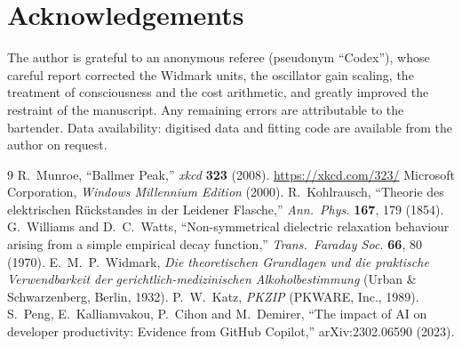 \documentclass[11pt]{article}
\begin{document}
\section*{Acknowledgements}
The author is grateful to an anonymous referee (pseudonym ``Codex''), whose careful report corrected the Widmark units, the oscillator gain scaling, the treatment of consciousness and the cost arithmetic, and greatly improved the restraint of the manuscript. Any remaining errors are attributable to the bartender. Data availability: digitised data and fitting code are available from the author on request.

\begin{thebibliography}{9}
 R.~Munroe, ``Ballmer Peak,'' \emph{xkcd} \textbf{323} (2008). \url{https://xkcd.com/323/}
 Microsoft Corporation, \emph{Windows Millennium Edition} (2000).
 R.~Kohlrausch, ``Theorie des elektrischen R\"uckstandes in der Leidener Flasche,'' \emph{Ann.\ Phys.} \textbf{167}, 179 (1854).
 G.~Williams and D.~C.~Watts, ``Non-symmetrical dielectric relaxation behaviour arising from a simple empirical decay function,'' \emph{Trans.\ Faraday Soc.} \textbf{66}, 80 (1970).
 E.~M.~P.~Widmark, \emph{Die theoretischen Grundlagen und die praktische Verwendbarkeit der gerichtlich-medizinischen Alkoholbestimmung} (Urban \& Schwarzenberg, Berlin, 1932).
 P.~W.~Katz, \emph{PKZIP} (PKWARE, Inc., 1989).
 S.~Peng, E.~Kalliamvakou, P.~Cihon and M.~Demirer, ``The impact of AI on developer productivity: Evidence from GitHub Copilot,'' arXiv:2302.06590 (2023).
\end{thebibliography}
\end{document}
